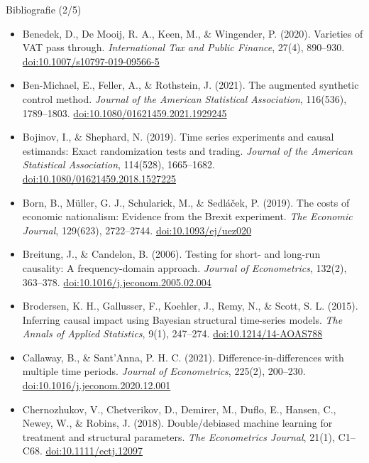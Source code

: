 \begin{frame}{Bibliografie (2/5)}
\itemsize{\tiny}
\begin{itemize}
    \item Benedek, D., De Mooij, R. A., Keen, M., \& Wingender, P. (2020). Varieties of VAT pass through. \textit{International Tax and Public Finance}, 27(4), 890--930. \href{https://doi.org/10.1007/s10797-019-09566-5}{doi:10.1007/s10797-019-09566-5}
    \item Ben-Michael, E., Feller, A., \& Rothstein, J. (2021). The augmented synthetic control method. \textit{Journal of the American Statistical Association}, 116(536), 1789--1803. \href{https://doi.org/10.1080/01621459.2021.1929245}{doi:10.1080/01621459.2021.1929245}
    \item Bojinov, I., \& Shephard, N. (2019). Time series experiments and causal estimands: Exact randomization tests and trading. \textit{Journal of the American Statistical Association}, 114(528), 1665--1682. \href{https://doi.org/10.1080/01621459.2018.1527225}{doi:10.1080/01621459.2018.1527225}
    \item Born, B., Müller, G. J., Schularick, M., \& Sedláček, P. (2019). The costs of economic nationalism: Evidence from the Brexit experiment. \textit{The Economic Journal}, 129(623), 2722--2744. \href{https://doi.org/10.1093/ej/uez020}{doi:10.1093/ej/uez020}
    \item Breitung, J., \& Candelon, B. (2006). Testing for short- and long-run causality: A frequency-domain approach. \textit{Journal of Econometrics}, 132(2), 363--378. \href{https://doi.org/10.1016/j.jeconom.2005.02.004}{doi:10.1016/j.jeconom.2005.02.004}
    \item Brodersen, K. H., Gallusser, F., Koehler, J., Remy, N., \& Scott, S. L. (2015). Inferring causal impact using Bayesian structural time-series models. \textit{The Annals of Applied Statistics}, 9(1), 247--274. \href{https://doi.org/10.1214/14-AOAS788}{doi:10.1214/14-AOAS788}
    \item Callaway, B., \& Sant’Anna, P. H. C. (2021). Difference-in-differences with multiple time periods. \textit{Journal of Econometrics}, 225(2), 200--230. \href{https://doi.org/10.1016/j.jeconom.2020.12.001}{doi:10.1016/j.jeconom.2020.12.001}
    \item Chernozhukov, V., Chetverikov, D., Demirer, M., Duflo, E., Hansen, C., Newey, W., \& Robins, J. (2018). Double/debiased machine learning for treatment and structural parameters. \textit{The Econometrics Journal}, 21(1), C1--C68. \href{https://doi.org/10.1111/ectj.12097}{doi:10.1111/ectj.12097}

\end{itemize}
\end{frame}
